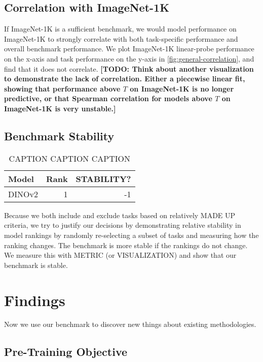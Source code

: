 \documentclass{article}
\newcommand{\todo}[1]{\textbf{\color{red}[TODO: #1]}}
\begin{document}
\subsection{Correlation with ImageNet-1K}\label{sec:imagenet1k-correlation}


If ImageNet-1K \citep{deng2009imagenet1k} is a sufficient benchmark, we would model performance on ImageNet-1K to strongly correlate with both task-specific performance and overall benchmark performance.
We plot ImageNet-1K linear-probe performance on the x-axis and task performance on the y-axis in \cref{fig:general-correlation}, and find that it does not correlate.
\todo{Think about another visualization to demonstrate the lack of correlation. Either a piecewise linear fit, showing that performance above $T$ on ImageNet-1K is no longer predictive, or that Spearman correlation for models above $T$ on ImageNet-1K is very unstable.}

\subsection{Benchmark Stability}


\begin{table}[t]
    \centering
    \small
    \caption{CAPTION CAPTION CAPTION}
    \label{tab:imagenet1k-ranking}
    \begin{tabular}{lrr}
        \toprule
        Model & Rank & STABILITY? \\
        \midrule
        DINOv2 & 1 & -1 \\
        \bottomrule
    \end{tabular}
\end{table}

Because we both include and exclude tasks based on relatively MADE UP criteria, we try to justify our decisions by demonstrating relative stability in model rankings by randomly re-selecting a subset of tasks and measuring how the ranking changes.
The benchmark is more stable if the rankings do not change.
We measure this with METRIC (or VISUALIZATION) and show that our benchmark is stable.

\section{Findings}

Now we use our benchmark to discover new things about existing methodologies.

\subsection{Pre-Training Objective}
\end{document}
